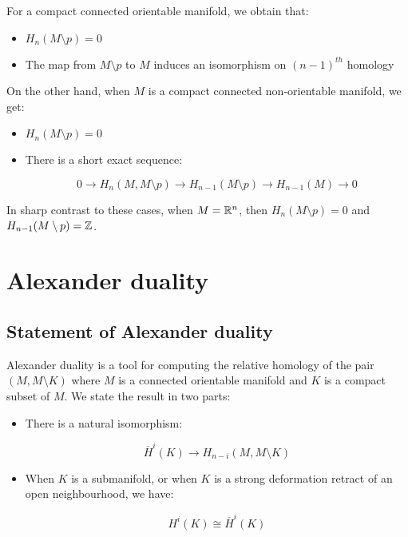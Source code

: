 \documentclass[a4paper]{amsart}
\begin{document}
For a compact connected orientable manifold, we obtain that:

\begin{itemize}

\item $H_n(M \setminus p) = 0$

\item The map from $M \setminus p$ to $M$ induces an isomorphism on
  $(n-1)^{th}$ homology

\end{itemize}

On the other hand, when $M$ is a compact connected non-orientable
manifold, we get:

\begin{itemize}

\item $H_n(M \setminus p) = 0$

\item There is a short exact sequence:

  $$0 \to H_n(M, M \setminus p) \to H_{n-1}(M \setminus p) \to H_{n-1}(M) \to 0$$

\end{itemize}

In sharp contrast to these cases, when $M = \mathbb{R}^n$, then $H_n(M
\setminus p) = 0$ and $H_{n-1}(M \setminus p) = \mathbb{Z}$.

\section{Alexander duality}

\subsection{Statement of Alexander duality}

Alexander duality is a tool for computing the relative homology of the
pair $(M, M \setminus K)$ where $M$ is a connected orientable manifold
and $K$ is a compact subset of $M$. We state the result in two parts:

\begin{itemize}

\item There is a natural isomorphism:

  $$\overline{H}^i(K) \to H_{n-i}(M, M \setminus K)$$

\item When $K$ is a submanifold, or when $K$ is a strong deformation
  retract of an open neighbourhood, we have:

  $$H^i(K) \cong \overline{H}^i(K)$$

\end{itemize}
\end{document}
